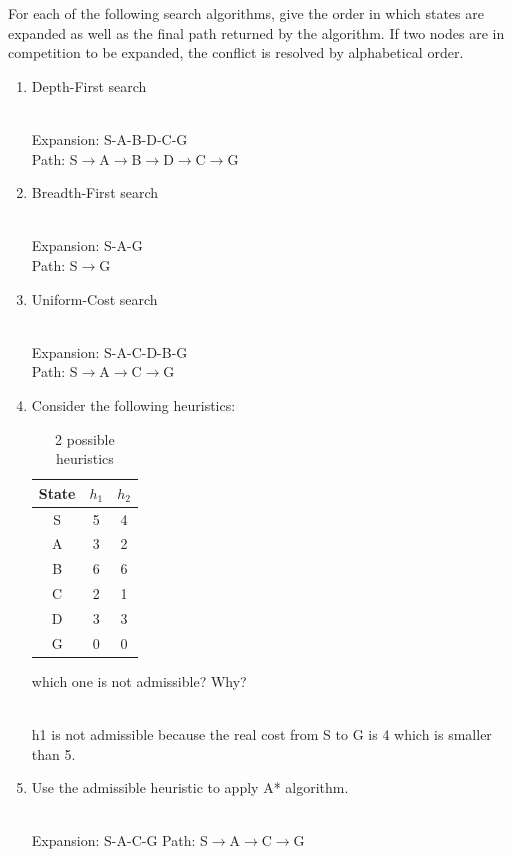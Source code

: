 \documentclass[9pt,a4paper]{extarticle}
\newenvironment{solution}
    {%
    \color{red}
    }
    { 
    \color{black}
    }
\begin{document}
For each of the following search algorithms, give the order in which states are expanded as well as the final path returned by the algorithm. If two nodes are in competition to be expanded, the conflict is resolved by alphabetical order.
\begin{enumerate}
    \item Depth-First search
    \begin{solution}
    \\
    Expansion: S-A-B-D-C-G\\
    Path: S$\rightarrow$A$\rightarrow$B$\rightarrow$D$\rightarrow$C$\rightarrow$G
    \end{solution}
    \item Breadth-First search
    \begin{solution}
    \\
    Expansion: S-A-G\\
    Path: S$\rightarrow$G
    \end{solution}
    \item Uniform-Cost search
    \begin{solution}
    \\
    Expansion: S-A-C-D-B-G\\
    Path: S$\rightarrow$A$\rightarrow$C$\rightarrow$G
    \end{solution}
    \item Consider the following heuristics:
    \begin{table}[h]
        \centering
        \begin{tabular}{|c|c|c|}
        \hline
            State & $h_1$ & $h_2$ \\ \hline
            S & 5 & 4\\ \hline
            A & 3 & 2\\ \hline
            B & 6 & 6\\ \hline
            C & 2 & 1\\ \hline
            D & 3 & 3\\ \hline
            G & 0 & 0\\ \hline
        \end{tabular}
        \caption{2 possible heuristics}
        \label{tab:my_label}
    \end{table}
    which one is not admissible? Why?
    \begin{solution}
    \\
    h1 is not admissible because the real cost from S to G is 4 which is smaller than 5.
    \end{solution}
    \item Use the admissible heuristic to apply A* algorithm.
    \begin{solution}
    \\
    Expansion: S-A-C-G
    Path: S$\rightarrow$A$\rightarrow$C$\rightarrow$G
    \end{solution}
\end{enumerate}
\end{document}
